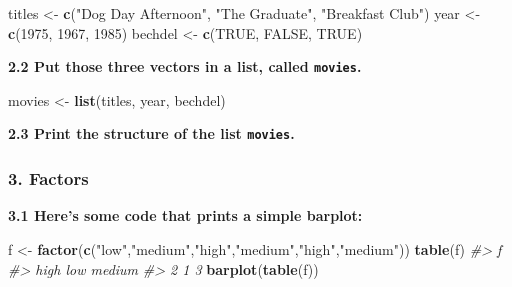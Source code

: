 \documentclass[]{book}
\newenvironment{Shaded}{\begin{snugshade}}{\end{snugshade}}
\newcommand{\CommentTok}[1]{\textcolor[rgb]{0.56,0.35,0.01}{\textit{#1}}}
\newcommand{\DecValTok}[1]{\textcolor[rgb]{0.00,0.00,0.81}{#1}}
\newcommand{\KeywordTok}[1]{\textcolor[rgb]{0.13,0.29,0.53}{\textbf{#1}}}
\newcommand{\NormalTok}[1]{#1}
\newcommand{\OtherTok}[1]{\textcolor[rgb]{0.56,0.35,0.01}{#1}}
\newcommand{\StringTok}[1]{\textcolor[rgb]{0.31,0.60,0.02}{#1}}
\begin{document}
\begin{Shaded}
\begin{Highlighting}[]
\NormalTok{titles <-}\StringTok{ }\KeywordTok{c}\NormalTok{(}\StringTok{"Dog Day Afternoon"}\NormalTok{, }\StringTok{"The Graduate"}\NormalTok{, }\StringTok{"Breakfast Club"}\NormalTok{)}
\NormalTok{year <-}\StringTok{ }\KeywordTok{c}\NormalTok{(}\DecValTok{1975}\NormalTok{, }\DecValTok{1967}\NormalTok{, }\DecValTok{1985}\NormalTok{)}
\NormalTok{bechdel <-}\StringTok{ }\KeywordTok{c}\NormalTok{(}\OtherTok{TRUE}\NormalTok{, }\OtherTok{FALSE}\NormalTok{, }\OtherTok{TRUE}\NormalTok{)}
\end{Highlighting}
\end{Shaded}

\textbf{2.2 Put those three vectors in a list, called \texttt{movies}.}

\begin{Shaded}
\begin{Highlighting}[]
\NormalTok{movies <-}\StringTok{ }\KeywordTok{list}\NormalTok{(titles, year, bechdel)}
\end{Highlighting}
\end{Shaded}

\textbf{2.3 Print the structure of the list \texttt{movies}.}

\begin{Shaded}
\end{Shaded}

\hypertarget{factors-1}{%
\subsubsection*{3. Factors}\label{factors-1}}

\textbf{3.1 Here's some code that prints a simple barplot:}

\begin{Shaded}
\begin{Highlighting}[]
\NormalTok{f <-}\StringTok{ }\KeywordTok{factor}\NormalTok{(}\KeywordTok{c}\NormalTok{(}\StringTok{"low"}\NormalTok{,}\StringTok{"medium"}\NormalTok{,}\StringTok{"high"}\NormalTok{,}\StringTok{"medium"}\NormalTok{,}\StringTok{"high"}\NormalTok{,}\StringTok{"medium"}\NormalTok{))}
\KeywordTok{table}\NormalTok{(f)}
\CommentTok{#> f}
\CommentTok{#>   high    low medium }
\CommentTok{#>      2      1      3}
\KeywordTok{barplot}\NormalTok{(}\KeywordTok{table}\NormalTok{(f))}
\end{Highlighting}
\end{Shaded}
\end{document}
